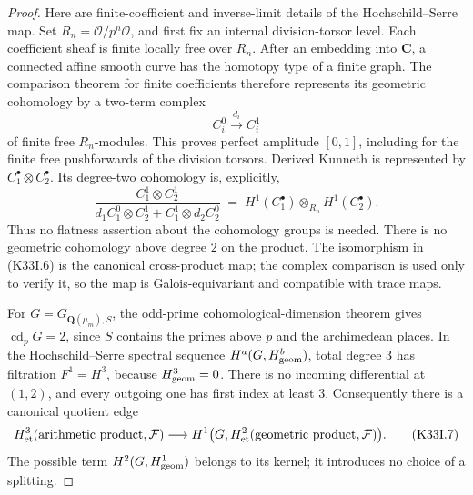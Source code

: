 \begin{proof}
Here are finite-coefficient and inverse-limit details of the
Hochschild--Serre map.  Set \(R_n=\mathcal O/p^n\mathcal O\), and first
fix an internal division-torsor level.  Each coefficient sheaf is
finite locally free over \(R_n\).  After an embedding into
\(\mathbf C\), a connected affine smooth curve has the homotopy type
of a finite graph.  The comparison theorem for finite coefficients
therefore represents its geometric cohomology by a two-term complex
\[
 C_i^0\xrightarrow{d_i}C_i^1
\]
of finite free \(R_n\)-modules.  This proves perfect amplitude
\([0,1]\), including for the finite free pushforwards of the division
torsors.  Derived Kunneth is represented by \(C_1^\bullet\otimes
C_2^\bullet\).  Its degree-two cohomology is, explicitly,
\[
 \frac{C_1^1\otimes C_2^1}
      {d_1C_1^0\otimes C_2^1+C_1^1\otimes d_2C_2^0}
   \;=\;H^1(C_1^\bullet)\otimes_{R_n}H^1(C_2^\bullet).
                                                               \tag{K33I.6}
\]
Thus no flatness assertion about the cohomology groups is needed.
There is no geometric cohomology above degree \(2\) on the product.
The isomorphism in (K33I.6) is the canonical cross-product map; the
complex comparison is used only to verify it, so the map is
Galois-equivariant and compatible with trace maps.

For \(G=G_{\mathbf Q(\mu_m),S}\), the odd-prime cohomological-dimension
theorem gives \(\operatorname{cd}_pG=2\), since \(S\) contains the primes
above \(p\) and the archimedean places.  In the Hochschild--Serre
spectral sequence \(H^a(G,H^b_{\rm geom})\), total degree \(3\) has
filtration \(F^1=H^3\), because \(H^3_{\rm geom}=0\).
There is no incoming differential at \((1,2)\), and every outgoing
one has first index at least \(3\).  Consequently there is a
canonical quotient edge
\[
 H^3_{\rm et}(\text{arithmetic product},{\cal F})
   \longrightarrow
 H^1\bigl(G,H^2_{\rm et}(\text{geometric product},{\cal F})\bigr).
                                                               \tag{K33I.7}
\]
The possible term \(H^2(G,H^1_{\rm geom})\) belongs to its kernel;
it introduces no choice of a splitting.


\end{proof}
